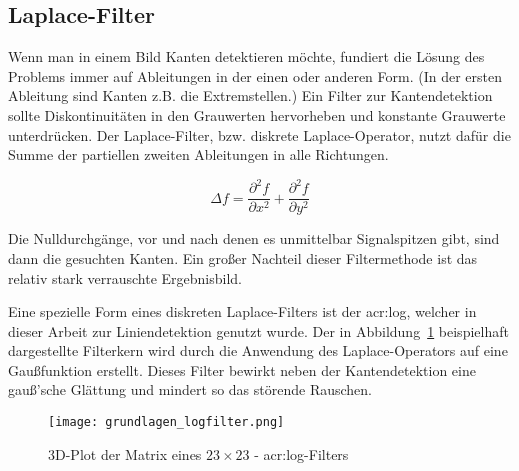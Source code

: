 \subsection{Laplace-Filter}

Wenn man in einem Bild Kanten detektieren möchte, fundiert die Lösung des Problems immer auf Ableitungen in der einen oder anderen Form. (In der ersten Ableitung sind Kanten z.B. die Extremstellen.) Ein Filter zur Kantendetektion sollte Diskontinuitäten in den Grauwerten hervorheben und konstante Grauwerte unterdrücken. Der Laplace-Filter, bzw. diskrete Laplace-Operator, nutzt dafür die Summe der partiellen zweiten Ableitungen in alle Richtungen. \autocite{jaehneDigitaleBildverarbeitungMit2005}

\begin{equation}
\Delta f = \frac{\partial^2 f}{\partial x^2} + \frac{\partial^2 f}{\partial y^2}
\end{equation}

Die Nulldurchgänge, vor und nach denen es unmittelbar Signalspitzen gibt, sind dann die gesuchten Kanten. Ein großer Nachteil dieser Filtermethode ist das relativ stark verrauschte Ergebnisbild.

Eine spezielle Form eines diskreten Laplace-Filters ist der \gls{acr:log}, welcher in dieser Arbeit zur Liniendetektion genutzt wurde. Der in Abbildung~\ref{fig:grundlagen_logfilter} beispielhaft dargestellte Filterkern wird durch die Anwendung des Laplace-Operators auf eine Gaußfunktion erstellt. Dieses Filter bewirkt neben der Kantendetektion eine gauß'sche Glättung und mindert so das störende Rauschen.

\begin{figure}[H] %
  \centering
  \texttt{[image: grundlagen\_logfilter.png]}
  \caption{3D-Plot der Matrix eines \( 23\times23\) - \gls{acr:log}-Filters}
  \label{fig:grundlagen_logfilter}
\end{figure}  

